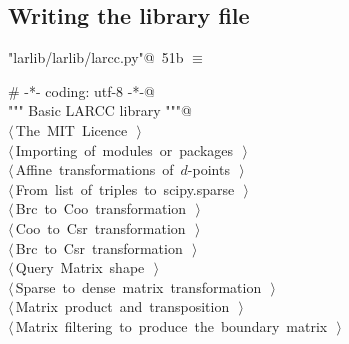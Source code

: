 \documentclass[11pt,oneside]{article}    %
\begin{document}
\subsection{Writing the library file}

\begin{flushleft} \small \label{scrap82}
\protect{}\verb@"larlib/larlib/larcc.py"@\nobreak\ {\footnotesize 51b }$\equiv$
\vspace{-1ex}
\begin{list}{}{} \item
\mbox{}\verb@# -*- coding: utf-8 -*-@\\
\mbox{}\verb@""" Basic LARCC library """@\\
\mbox{}\verb@@\hbox{$\langle\,$The MIT Licence\nobreak\ {\footnotesize {}}$\,\rangle$}\verb@@\\
\mbox{}\verb@@\hbox{$\langle\,$Importing of modules or packages\nobreak\ {\footnotesize {}}$\,\rangle$}\verb@@\\
\mbox{}\verb@@\hbox{$\langle\,$Affine transformations of $d$-points\nobreak\ {\footnotesize {}}$\,\rangle$}\verb@@\\
\mbox{}\verb@@\hbox{$\langle\,$From list of triples to scipy.sparse\nobreak\ {\footnotesize {}}$\,\rangle$}\verb@@\\
\mbox{}\verb@@\hbox{$\langle\,$Brc to Coo transformation\nobreak\ {\footnotesize {}}$\,\rangle$}\verb@@\\
\mbox{}\verb@@\hbox{$\langle\,$Coo to Csr transformation\nobreak\ {\footnotesize {}}$\,\rangle$}\verb@@\\
\mbox{}\verb@@\hbox{$\langle\,$Brc to Csr transformation\nobreak\ {\footnotesize {}}$\,\rangle$}\verb@@\\
\mbox{}\verb@@\hbox{$\langle\,$Query Matrix shape\nobreak\ {\footnotesize {}}$\,\rangle$}\verb@@\\
\mbox{}\verb@@\hbox{$\langle\,$Sparse to dense matrix transformation\nobreak\ {\footnotesize {}}$\,\rangle$}\verb@@\\
\mbox{}\verb@@\hbox{$\langle\,$Matrix product and transposition\nobreak\ {\footnotesize {}}$\,\rangle$}\verb@@\\
\mbox{}\verb@@\hbox{$\langle\,$Matrix filtering to produce the boundary matrix\nobreak\ {\footnotesize {}}$\,\rangle$}\verb@@\\

\end{list}
\end{flushleft}
\end{document}
